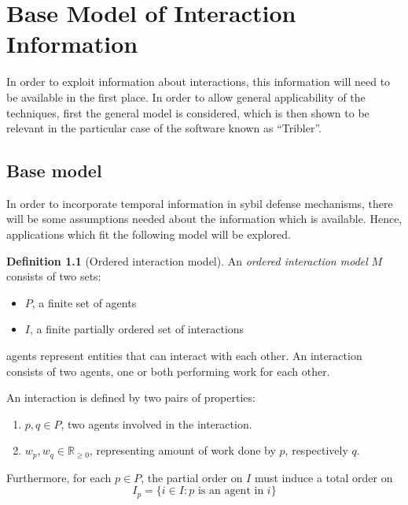 \documentclass[a4paper,11pt]{book}
\newcommand{\bb}{\mathbb}
\theoremstyle{definition}
\newtheorem{definition}{Definition}
\begin{document}
\chapter{Base Model of Interaction Information}

In order to exploit information about interactions, this information will need to be
available in the first place. In order to allow general applicability of the
techniques, first the general model is considered, which is then shown to be
relevant in the particular case of the software known as ``Tribler''.


\section{Base model}

In order to incorporate temporal information in sybil defense mechanisms,
there will be some assumptions needed about the information which is available.
Hence, applications which fit the following model will be explored.

\begin{definition}[Ordered interaction model]
    An \emph{ordered interaction model} $M$ consists of two sets:  
    
    \begin{itemize}
        \item $P$, a finite set of agents
        \item $I$, a finite partially ordered set of interactions
    \end{itemize}

    agents represent entities that can interact with each other.
    An interaction consists of two agents, one or both performing
    work for each other. 
    
    An interaction is defined by two pairs of properties:
    \begin{enumerate}
        \item $p, q \in P$, two agents involved in the interaction.
        \item $w_p, w_q \in \bb{R}_{\geq0}$, representing amount of work done by $p$, respectively $q$.
    \end{enumerate}

    Furthermore, for each $p \in P$, the partial order on $I$ must induce a total order on 
    \begin{equation*}
        I_p = \{i \in I : p \mbox{ is an agent in } i\}
    \end{equation*}
\end{definition}
\end{document}
